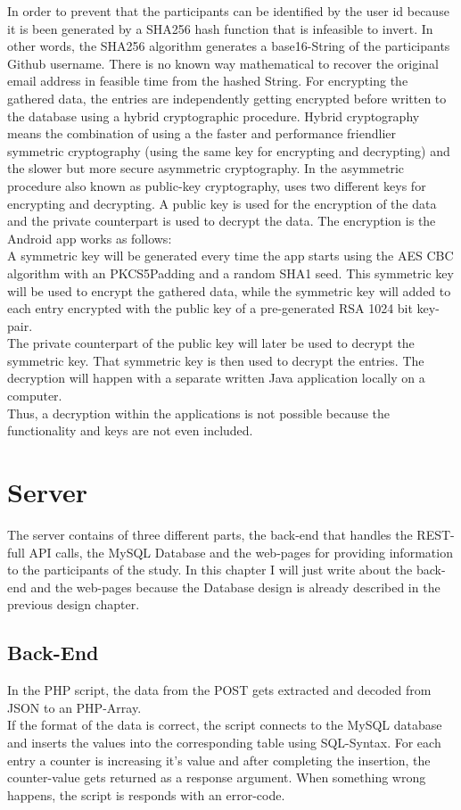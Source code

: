 In order to prevent that the participants can be identified by the user id because it is been generated by a SHA256 hash function that is infeasible to invert. In other words, the SHA256 algorithm generates a base16-String of the participants Github username. There is no known way mathematical to recover the original email address in feasible time from the hashed String. 
\bigbreak
For encrypting the gathered data, the entries are independently getting encrypted before written to the database using a hybrid cryptographic procedure. Hybrid cryptography means the combination of using a the faster and performance friendlier symmetric cryptography (using the same key for encrypting and decrypting) and the slower but more secure asymmetric cryptography. In the asymmetric procedure also known as public-key cryptography, uses two different keys for encrypting and decrypting. A public key is used for the encryption of the data and the private counterpart is used to decrypt the data.
\bigbreak
The encryption is the Android app works as follows:\\
A symmetric key will be generated every time the app starts using the AES CBC algorithm with an PKCS5Padding and a random SHA1 seed. This symmetric key will be used to encrypt the gathered data, while the symmetric key will added to each entry encrypted with the public key of a pre-generated RSA 1024 bit key-pair.\\ 
The private counterpart of the public key will later be used to decrypt the symmetric key. That symmetric key is then used to decrypt the entries. 
The decryption will happen with a separate written Java application locally on a computer.\\
Thus, a decryption within the applications is not possible because the functionality and keys are not even included. 

\section{Server}
The server contains of three different parts, the back-end that handles the REST-full API calls, the MySQL Database and the web-pages for providing information to the participants of the study. 
In this chapter I will just write about the back-end and the web-pages because the Database design is already described in the previous design chapter. 

\subsection{Back-End}
In the PHP script, the data from the POST gets extracted and decoded from JSON to an PHP-Array.\\
If the format of the data is correct, the script connects to the MySQL database and inserts the values into the corresponding table using SQL-Syntax. For each entry a counter is increasing it's value and after completing the insertion, the counter-value gets returned as a response argument. When something wrong happens, the script is responds with an error-code. 

